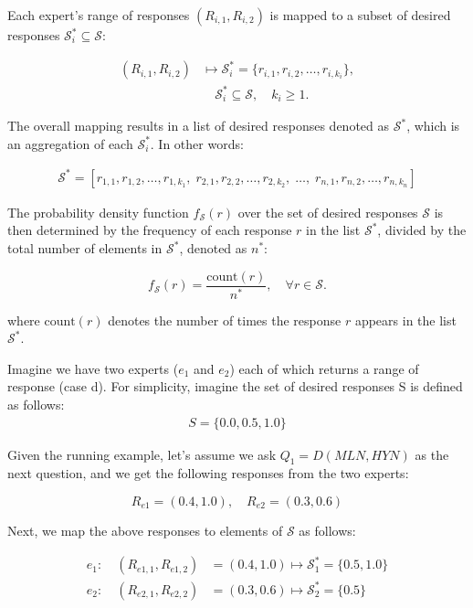 Each expert's range of responses $(R_{i,1}, R_{i,2})$ is mapped to a subset of desired responses $\mathcal{S}_i^* \subseteq \mathcal{S}$:

\begin{align*}
(R_{i,1}, R_{i,2}) & \mapsto \mathcal{S}_i^* = \{r_{i,1}, r_{i,2}, \ldots, r_{i,k_i}\}, \\
& \quad \mathcal{S}_i^* \subseteq \mathcal{S}, \quad k_i \geq 1.
\end{align*}


The overall mapping results in a list of desired responses denoted as $\mathcal{S}^*$, which is an aggregation of each $\mathcal{S}_i^*$. In other words:

\begin{align*}
\mathcal{S}^* = \left[ r_{1,1}, r_{1,2}, \ldots, r_{1,k_1}, \; 
                     r_{2,1}, r_{2,2}, \ldots, r_{2,k_2}, \; 
                     \ldots, \; 
                     r_{n,1}, r_{n,2}, \ldots, r_{n,k_n} \right]
\end{align*}


The probability density function $f_{\mathcal{S}}(r)$ over the set of desired responses $\mathcal{S}$ is then determined by the frequency of each response $r$ in the list $\mathcal{S}^*$, divided by the total number of elements in $\mathcal{S}^*$, denoted as $n^*$:

\[
f_{\mathcal{S}}(r) = \frac{\text{count}(r)}{n^*}, \quad \forall r \in \mathcal{S}.
\]


where $\text{count}(r)$ denotes the number of times the response $r$ appears in the list $\mathcal{S}^*$. 




Imagine we have two experts ($e_1$ and $e_2$) each of which returns a range of response (case d).
For simplicity, imagine the set of desired responses S is defined as follows:
        \begin{align*}
            S = \{0.0, 0.5, 1.0\}
        \end{align*}

        Given the running example, let's assume we ask  $Q_1 = D(MLN, HYN)$ as the next question, and we get the following responses from the two experts:

        \[
R_{e1} = (0.4, 1.0), \quad R_{e2} = (0.3, 0.6)
\]

Next, we map the above responses to elements of \( \mathcal{S} \) as follows:

\begin{align*}
    e_1: \quad (R_{e1, 1}, R_{e1, 2}) & = (0.4, 1.0) \mapsto \mathcal{S}_1^* = \{0.5, 1.0\} \\
    e_2: \quad (R_{e2, 1}, R_{e2, 2}) & = (0.3, 0.6) \mapsto \mathcal{S}_2^* = \{0.5\}
\end{align*}


